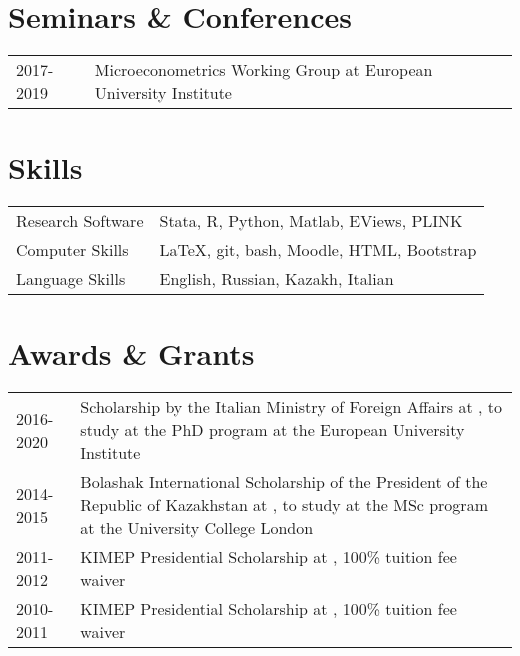 \documentclass{article}
\begin{document}
    \section*{Seminars \& Conferences}
  \begin{table}[H]
      \begin{tabular}{p{2cm}p{14cm}}
          2017-2019 & {Microeconometrics Working Group} at {European University Institute}\\
      \end{tabular}
    \end{table}


    \section*{Skills}\begin{table}[H]
    \begin{tabular}{p{2cm}p{14cm}}
        Research Software & Stata, R, Python, Matlab, EViews, PLINK \\
        Computer Skills & LaTeX, git, bash, Moodle, HTML, Bootstrap \\
        Language Skills & English, Russian, Kazakh, Italian \\
    \end{tabular}
  \end{table}


    \section*{Awards \& Grants}
  \begin{table}[H]
      \begin{tabular}{p{2cm}p{14cm}}
          2016-2020 & {Scholarship by the Italian Ministry of Foreign Affairs} at {}, to study at the PhD program at the European University Institute\\
          2014-2015 & {Bolashak International Scholarship of the President of the Republic of Kazakhstan} at {}, to study at the MSc program at the University College London\\
          2011-2012 & {KIMEP Presidential Scholarship} at {}, 100\% tuition fee waiver\\
          2010-2011 & {KIMEP Presidential Scholarship} at {}, 100\% tuition fee waiver\\
      \end{tabular}
    \end{table}

    
\end{document}
